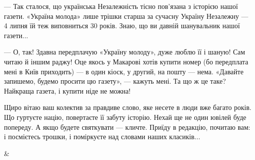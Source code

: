 \begin{longtable}
— Так сталося, що українська Незалежність тісно пов’язана з історією нашої
газети. «Україна молода» лише трішки старша за сучасну Україну Незалежну — 4
липня їй теж виповниться 30 років. Знаю, що ви давній шанувальник нашої
газети...

— О, так! Здавна передплачую «Україну молоду», дуже люблю її і шаную! Сам читаю
й іншим раджу! Оце якось у Макарові хотів купити номер (бо передплата мені в
Київ приходить) — в один кіоск, у другий, на пошту — нема. «Давайте запишемо,
будемо просити цю газету», — кажуть мені. Та що ж це таке? Найкраща газета, і
купити ніде не можна!

Щиро вітаю ваш колектив за правдиве слово, яке несете в люди вже багато років.
Що гуртуєте націю, повертаєте її забуту історію. Нехай ще не один ювілей буде
попереду. А якщо будете святкувати — кличте. Приїду в редакцію, почитаю вам: і
посмієтесь трошки, і поміркуєте над словами наших класиків...

&

	
\end{longtable}
